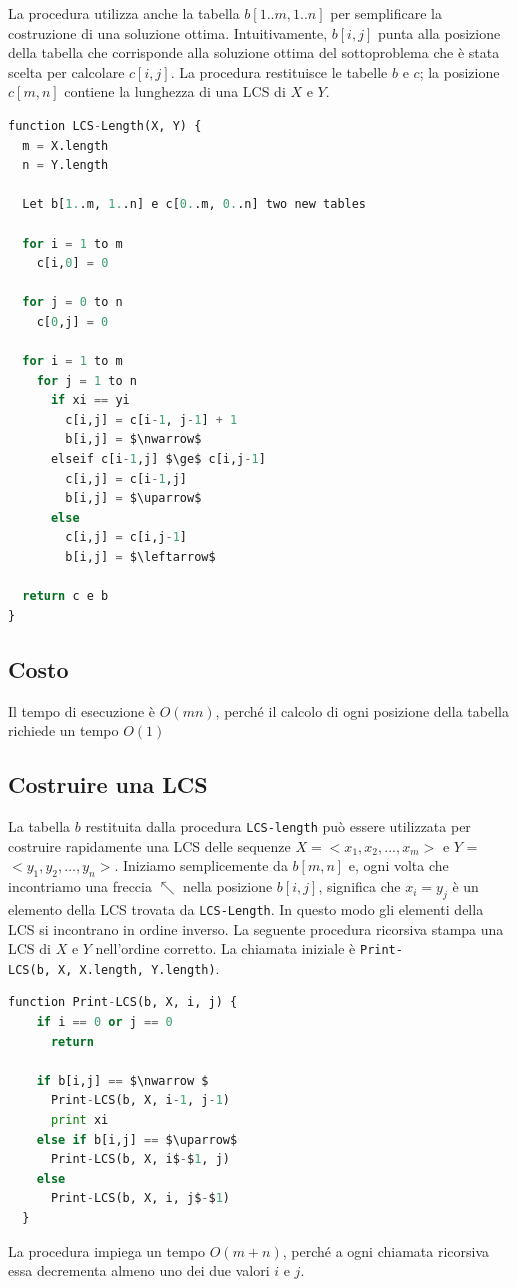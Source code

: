 La procedura utilizza anche la tabella $b[1..m, 1..n]$ per
semplificare la costruzione di una soluzione ottima. Intuitivamente,
$b[i, j]$ punta alla posizione della tabella che corrisponde alla
soluzione ottima del sottoproblema che è stata scelta per calcolare
$c[i,j]$. La procedura restituisce le tabelle $b$ e $c$; la
posizione $c[m,n]$ contiene la lunghezza di una LCS di $X$ e $Y$.\\

\begin{lstlisting}[language=Python, mathescape=true]
function LCS-Length(X, Y) {
  m = X.length
  n = Y.length

  Let b[1..m, 1..n] e c[0..m, 0..n] two new tables

  for i = 1 to m
    c[i,0] = 0

  for j = 0 to n
    c[0,j] = 0

  for i = 1 to m
    for j = 1 to n
      if xi == yi
        c[i,j] = c[i-1, j-1] + 1
        b[i,j] = $\nwarrow$
      elseif c[i-1,j] $\ge$ c[i,j-1]
        c[i,j] = c[i-1,j]
        b[i,j] = $\uparrow$
      else 
        c[i,j] = c[i,j-1] 
        b[i,j] = $\leftarrow$

  return c e b
}
\end{lstlisting}

\subsection{Costo}

Il tempo di esecuzione è $O(mn)$, perché il calcolo di ogni posizione
della tabella richiede un tempo $O(1)$

\subsection{Costruire una LCS}

La tabella $b$ restituita dalla procedura \texttt{LCS-length} può
essere utilizzata per costruire rapidamente una LCS delle sequenze
$X = <x_1, x_2, ..., x_m>$ e $Y$ = $<y_1, y_2, ..., y_n>$.
Iniziamo semplicemente da $b[m,n]$ e, ogni volta che incontriamo una
freccia $\nwarrow $ nella posizione $b[i,j]$, significa che $x_i = y_j$ è
un elemento della LCS trovata da \texttt{LCS-Length}. In questo modo gli
elementi della LCS si incontrano in ordine inverso. La seguente
procedura ricorsiva stampa una LCS di $X$ e $Y$ nell'ordine
corretto. La chiamata iniziale è
\texttt{Print-LCS(b,\ X,\ X.length,\ Y.length)}.\\

\begin{minipage}{\textwidth}
  \begin{lstlisting}[language=Python, mathescape=true]
function Print-LCS(b, X, i, j) {
    if i == 0 or j == 0
      return

    if b[i,j] == $\nwarrow $
      Print-LCS(b, X, i-1, j-1)
      print xi
    else if b[i,j] == $\uparrow$
      Print-LCS(b, X, i$-$1, j)
    else
      Print-LCS(b, X, i, j$-$1)
  }
\end{lstlisting}
\end{minipage}

La procedura impiega un tempo $O(m + n)$, perché a ogni chiamata
ricorsiva essa decrementa almeno uno dei due valori $i$ e $j$.
